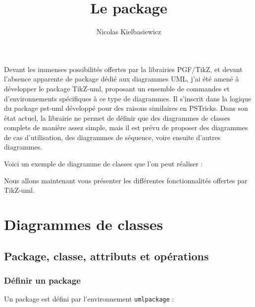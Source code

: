 \documentclass[a4paper,11pt]{report}
\title{Le package \tuml} %
\author{Nicolas {\sc Kielbasiewicz}} %
\newcommand{\inputTikZ}[1]{%
  }%
\newcommand{\inputTikZ}[1]{%
    \texttt{[image: fig/\#1.pdf]}%
  }%
\newcommand{\tuml}{{\sc TikZ-uml}}
\begin{document}
\maketitle

Devant les immenses possibilités offertes par la librairies PGF/TikZ, et devant l'absence apparente de package dédié aux diagrammes UML, j'ai été amené à développer le package \tuml, proposant un ensemble de commandes et d'environnements spécifiques à ce type de diagrammes. Il s'inscrit dans la logique du package pst-uml développé pour des raisons similaires en PSTricks. Dans son état actuel, la librairie ne permet de définir que des diagrammes de classes complets de manière assez simple, mais il est prévu de proposer des diagrammes de cas d'utilisation, des diagrammes de séquence, voire ensuite d'autres diagrammes.

Voici un exemple de diagramme de classes que l'on peut réaliser :

\begin{center}
\inputTikZ{figure1}
\end{center}

Nous allons maintenant vous présenter les différentes fonctionnalités offertes par \tuml.

\tableofcontents

\chapter{Diagrammes de classes}\label{c.class}

\section{Package, classe, attributs et opérations}\label{s.packageclass}

\subsection{Définir un package}\label{ss.package}

Un package est défini par l'environnement {\tt umlpackage} :

\medskip

\begin{minipage}{0.5\textwidth}

\end{minipage}
\begin{minipage}{0.4\textwidth}
\begin{center}
\inputTikZ{figure2}
\end{center}
\end{minipage}
\end{document}
